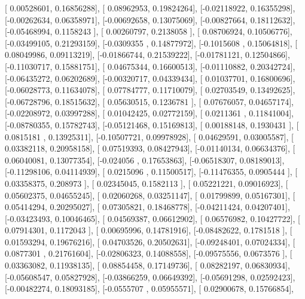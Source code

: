 \documentclass{article}
\begin{document}
       [ 0.00528601,  0.16856288],
       [ 0.08962953,  0.19824264],
       [-0.02118922,  0.16355298],
       [-0.00262634,  0.06358971],
       [-0.00692658,  0.13075069],
       [-0.00827664,  0.18112632],
       [-0.05468994,  0.1158243 ],
       [ 0.00260797,  0.2138058 ],
       [ 0.08706924,  0.10506776],
       [-0.03499105,  0.21293159],
       [-0.0309355 ,  0.14877972],
       [-0.1015608 ,  0.15064818],
       [ 0.08049986,  0.09113219],
       [-0.01866744,  0.21539222],
       [-0.01781121,  0.12504866],
       [-0.11030717,  0.15881751],
       [ 0.04675344,  0.16600513],
       [-0.01110882,  0.20342724],
       [-0.06435272,  0.06202689],
       [-0.00320717,  0.04339434],
       [ 0.01037701,  0.16800696],
       [-0.06028773,  0.11634078],
       [ 0.07784777,  0.11710079],
       [ 0.02703549,  0.13492625],
       [-0.06728796,  0.18515632],
       [ 0.05630515,  0.1236781 ],
       [ 0.07676057,  0.04657174],
       [-0.02208972,  0.03997288],
       [ 0.01042425,  0.02772159],
       [ 0.0211361 ,  0.11841004],
       [-0.08780355,  0.15782743],
       [-0.05121468,  0.15169813],
       [ 0.00188148,  0.1930431 ],
       [ 0.0815181 ,  0.13925311],
       [-0.10507721,  0.09978928],
       [ 0.04629591,  0.03005587],
       [ 0.03382118,  0.20958158],
       [ 0.07519393,  0.08427943],
       [-0.01140134,  0.06634376],
       [ 0.06040081,  0.13077354],
       [-0.024056  ,  0.17653863],
       [-0.06518307,  0.08189013],
       [-0.11298106,  0.04114939],
       [ 0.0215096 ,  0.11500517],
       [-0.11476355,  0.0905444 ],
       [ 0.03358375,  0.208973  ],
       [ 0.02345045,  0.1582113 ],
       [ 0.05221221,  0.09016923],
       [ 0.05602375,  0.04655245],
       [ 0.02060268,  0.03251147],
       [ 0.01799899,  0.05167301],
       [ 0.05414294,  0.20295027],
       [ 0.07305821,  0.18468778],
       [-0.04211424,  0.04207401],
       [-0.03423493,  0.10046465],
       [ 0.04569387,  0.06612902],
       [ 0.06576982,  0.10427722],
       [ 0.07914301,  0.1172043 ],
       [ 0.00695996,  0.14781916],
       [-0.08482622,  0.1781518 ],
       [ 0.01593294,  0.19676216],
       [ 0.04703526,  0.20502631],
       [-0.09248401,  0.07024334],
       [ 0.0877301 ,  0.21761604],
       [-0.02806323,  0.14088558],
       [-0.09575556,  0.0673576 ],
       [ 0.03363082,  0.11938135],
       [ 0.08854458,  0.17149736],
       [ 0.08282197,  0.06830934],
       [-0.05608547,  0.05827928],
       [-0.03866259,  0.06649392],
       [-0.05691298,  0.02592423],
       [-0.00482274,  0.18093185],
       [-0.0555707 ,  0.05955571],
       [ 0.02900678,  0.15766854],
\end{document}
